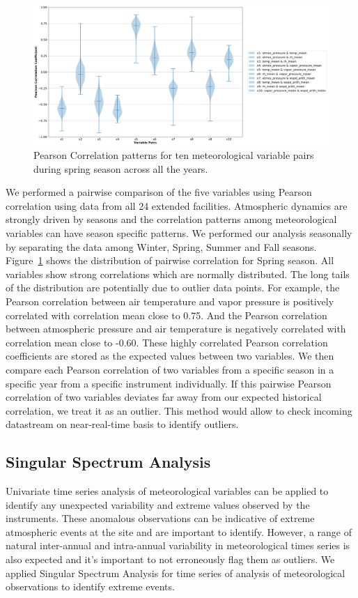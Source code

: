 \begin{figure}[ht]
    \centering
    \includegraphics[width=\textwidth]{figures/Spring.png}
    \caption{Pearson Correlation patterns for ten meteorological variable pairs
		during spring season across all the years.}
    \label{fig:pc}
\end{figure}

We performed a pairwise comparison of the five variables using Pearson
correlation using data from all 24 extended facilities. Atmospheric
dynamics are strongly driven by seasons and the correlation patterns
among meteorological variables can have season specific patterns. We
performed our analysis seasonally by separating the data among Winter, Spring,
Summer and Fall seasons. Figure~\ref{fig:pc} shows the distribution of
pairwise correlation for Spring season. All variables show strong
correlations which are normally distributed. The long tails of the
distribution are potentially due to outlier data points. 
For example, the Pearson correlation between
air temperature and vapor pressure is positively
correlated with correlation mean close to 0.75. And the Pearson
correlation between atmospheric pressure and air temperature is
negatively correlated with correlation mean close to -0.60. These highly
correlated Pearson correlation coefficients are stored as the expected
values between two variables. We then compare each Pearson correlation
of two variables from a specific season in a specific year from a
specific instrument individually. If this pairwise Pearson correlation
of two variables deviates far away from our expected historical
correlation, we treat it as an outlier. This method would allow to check
incoming datastream on near-real-time basis to identify outliers.

\subsection{Singular Spectrum Analysis}
Univariate time series analysis of meteorological variables can be
applied to identify any unexpected variability and extreme values
observed by the instruments. These anomalous observations can be
indicative of extreme atmospheric events at the site and are important
to identify. However, a range of natural inter-annual and intra-annual variability in
meteorological times series is also expected and it's important to not
erroneously flag them as outliers. We applied Singular Spectrum Analysis
for time series of analysis of meteorological observations to identify
extreme events.

